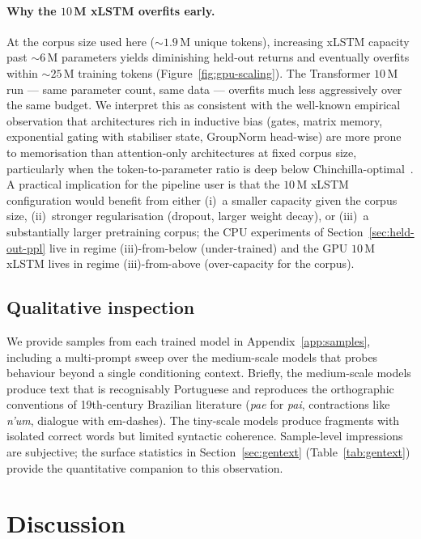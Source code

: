 \documentclass[11pt]{article}
\begin{document}
\paragraph{Why the $10$\,M xLSTM overfits early.}
At the corpus size used here ($\sim$$1.9$\,M unique tokens),
increasing xLSTM capacity past $\sim$$6$\,M parameters yields
diminishing held-out returns and eventually overfits within
$\sim$$25$\,M training tokens (Figure~\ref{fig:gpu-scaling}). The
Transformer $10$\,M run --- same parameter count, same data ---
overfits much less aggressively over the same budget. We interpret
this as consistent with the well-known empirical observation that
architectures rich in inductive bias (gates, matrix memory,
exponential gating with stabiliser state, GroupNorm head-wise) are
more prone to memorisation than attention-only architectures at
fixed corpus size, particularly when the token-to-parameter ratio is
deep below
Chinchilla-optimal~\cite{hoffmann2022}. A practical implication for
the pipeline user is that the $10$\,M xLSTM configuration would
benefit from either (i)~a smaller capacity given the corpus size,
(ii)~stronger regularisation (dropout, larger weight decay), or
(iii)~a substantially larger pretraining corpus; the CPU experiments
of Section~\ref{sec:held-out-ppl} live in regime (iii)-from-below
(under-trained) and the GPU $10$\,M xLSTM lives in regime
(iii)-from-above (over-capacity for the corpus).

\subsection{Qualitative inspection}

We provide samples from each trained model in Appendix~\ref{app:samples},
including a multi-prompt sweep over the medium-scale models that probes
behaviour beyond a single conditioning context.
Briefly, the medium-scale models produce text that is recognisably
Portuguese and reproduces the orthographic conventions of 19th-century
Brazilian literature (\emph{pae} for \emph{pai}, contractions like
\emph{n'um}, dialogue with em-dashes). The tiny-scale models produce
fragments with isolated correct words but limited syntactic coherence.
Sample-level impressions are subjective; the surface statistics in
Section~\ref{sec:gentext} (Table~\ref{tab:gentext}) provide the
quantitative companion to this observation.

\section{Discussion}
\end{document}
